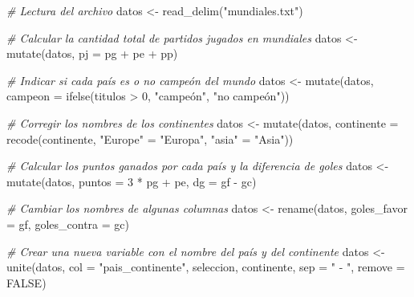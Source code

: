 \documentclass[
]{book}
\newenvironment{Shaded}{\begin{snugshade}}{\end{snugshade}}
\newcommand{\AttributeTok}[1]{\textcolor[rgb]{0.77,0.63,0.00}{#1}}
\newcommand{\CommentTok}[1]{\textcolor[rgb]{0.56,0.35,0.01}{\textit{#1}}}
\newcommand{\ConstantTok}[1]{\textcolor[rgb]{0.00,0.00,0.00}{#1}}
\newcommand{\DecValTok}[1]{\textcolor[rgb]{0.00,0.00,0.81}{#1}}
\newcommand{\FunctionTok}[1]{\textcolor[rgb]{0.00,0.00,0.00}{#1}}
\newcommand{\NormalTok}[1]{#1}
\newcommand{\OtherTok}[1]{\textcolor[rgb]{0.56,0.35,0.01}{#1}}
\newcommand{\SpecialCharTok}[1]{\textcolor[rgb]{0.00,0.00,0.00}{#1}}
\newcommand{\StringTok}[1]{\textcolor[rgb]{0.31,0.60,0.02}{#1}}
\begin{document}
\begin{Shaded}
\begin{Highlighting}[]
\CommentTok{\# Lectura del archivo}
\NormalTok{datos }\OtherTok{\textless{}{-}} \FunctionTok{read\_delim}\NormalTok{(}\StringTok{"mundiales.txt"}\NormalTok{)}

\CommentTok{\# Calcular la cantidad total de partidos jugados en mundiales}
\NormalTok{datos }\OtherTok{\textless{}{-}} \FunctionTok{mutate}\NormalTok{(datos, }\AttributeTok{pj =}\NormalTok{ pg }\SpecialCharTok{+}\NormalTok{ pe }\SpecialCharTok{+}\NormalTok{ pp)}

\CommentTok{\# Indicar si cada país es o no campeón del mundo}
\NormalTok{datos }\OtherTok{\textless{}{-}} \FunctionTok{mutate}\NormalTok{(datos, }\AttributeTok{campeon =} \FunctionTok{ifelse}\NormalTok{(titulos }\SpecialCharTok{\textgreater{}} \DecValTok{0}\NormalTok{, }\StringTok{"campeón"}\NormalTok{, }\StringTok{"no campeón"}\NormalTok{))}

\CommentTok{\# Corregir los nombres de los continentes}
\NormalTok{datos }\OtherTok{\textless{}{-}} \FunctionTok{mutate}\NormalTok{(datos, }\AttributeTok{continente =} \FunctionTok{recode}\NormalTok{(continente, }\StringTok{"Europe"} \OtherTok{=} \StringTok{"Europa"}\NormalTok{, }\StringTok{"asia"} \OtherTok{=} \StringTok{"Asia"}\NormalTok{))}

\CommentTok{\# Calcular los puntos ganados por cada país y la diferencia de goles}
\NormalTok{datos }\OtherTok{\textless{}{-}} \FunctionTok{mutate}\NormalTok{(datos, }\AttributeTok{puntos =} \DecValTok{3} \SpecialCharTok{*}\NormalTok{ pg }\SpecialCharTok{+}\NormalTok{ pe, }\AttributeTok{dg =}\NormalTok{ gf }\SpecialCharTok{{-}}\NormalTok{ gc)}

\CommentTok{\# Cambiar los nombres de algunas columnas}
\NormalTok{datos }\OtherTok{\textless{}{-}} \FunctionTok{rename}\NormalTok{(datos, }\AttributeTok{goles\_favor =}\NormalTok{ gf, }\AttributeTok{goles\_contra =}\NormalTok{ gc)}

\CommentTok{\# Crear una nueva variable con el nombre del país y del continente}
\NormalTok{datos }\OtherTok{\textless{}{-}} \FunctionTok{unite}\NormalTok{(datos, }\AttributeTok{col =} \StringTok{"pais\_continente"}\NormalTok{, seleccion, continente, }\AttributeTok{sep =} \StringTok{" {-} "}\NormalTok{, }\AttributeTok{remove =} \ConstantTok{FALSE}\NormalTok{)}
\end{Highlighting}
\end{Shaded}
\end{document}
